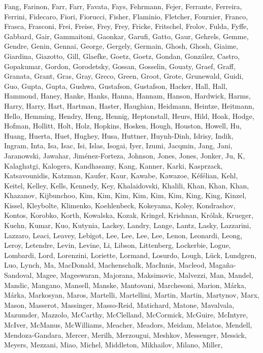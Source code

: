 \documentclass{aa}
\begin{document}
\begin{thebibliography}{242}
{  Fang, Farinon, Farr, Farr, Favata, Fays, Fehrmann, Fejer, Ferrante, Ferreira,
  Ferrini, Fidecaro, Fiori, Fiorucci, Fisher, Flaminio, Fletcher, Fournier,
  Franco, Frasca, Frasconi, Frei, Freise, Frey, Frey, Fricke, Fritschel,
  Frolov, Fulda, Fyffe, Gabbard, Gair, Gammaitoni, Gaonkar, Garufi, Gatto,
  Gaur, Gehrels, Gemme, Gendre, Genin, Gennai, George, Gergely, Germain, Ghosh,
  Ghosh, Giaime, Giardina, Giazotto, Gill, Glaefke, Goetz, Goetz, Gondan,
  González, Castro, Gopakumar, Gordon, Gorodetsky, Gossan, Gosselin, Gouaty,
  Graef, Graff, Granata, Grant, Gras, Gray, Greco, Green, Groot, Grote,
  Grunewald, Guidi, Guo, Gupta, Gupta, Gushwa, Gustafson, Gustafson, Hacker,
  Hall, Hall, Hammond, Haney, Hanke, Hanks, Hanna, Hannam, Hanson, Hardwick,
  Harms, Harry, Harry, Hart, Hartman, Haster, Haughian, Heidmann, Heintze,
  Heitmann, Hello, Hemming, Hendry, Heng, Hennig, Heptonstall, Heurs, Hild,
  Hoak, Hodge, Hofman, Hollitt, Holt, Holz, Hopkins, Hosken, Hough, Houston,
  Howell, Hu, Huang, Huerta, Huet, Hughey, Husa, Huttner, Huynh-Dinh, Idrisy,
  Indik, Ingram, Inta, Isa, Isac, Isi, Islas, Isogai, Iyer, Izumi, Jacqmin,
  Jang, Jani, Jaranowski, Jawahar, Jiménez-Forteza, Johnson, Jones, Jones,
  Jonker, Ju, K, Kalaghatgi, Kalogera, Kandhasamy, Kang, Kanner, Karki,
  Kasprzack, Katsavounidis, Katzman, Kaufer, Kaur, Kawabe, Kawazoe, Kéfélian,
  Kehl, Keitel, Kelley, Kells, Kennedy, Key, Khalaidovski, Khalili, Khan, Khan,
  Khan, Khazanov, Kijbunchoo, Kim, Kim, Kim, Kim, Kim, Kim, King, King, Kinzel,
  Kissel, Kleybolte, Klimenko, Koehlenbeck, Kokeyama, Koley, Kondrashov,
  Kontos, Korobko, Korth, Kowalska, Kozak, Kringel, Krishnan, Królak, Krueger,
  Kuehn, Kumar, Kuo, Kutynia, Lackey, Landry, Lange, Lantz, Lasky, Lazzarini,
  Lazzaro, Leaci, Leavey, Lebigot, Lee, Lee, Lee, Lee, Lenon, Leonardi, Leong,
  Leroy, Letendre, Levin, Levine, Li, Libson, Littenberg, Lockerbie, Logue,
  Lombardi, Lord, Lorenzini, Loriette, Lormand, Losurdo, Lough, Lück,
  Lundgren, Luo, Lynch, Ma, MacDonald, Machenschalk, MacInnis, Macleod,
  Magaña-Sandoval, Magee, Mageswaran, Majorana, Maksimovic, Malvezzi, Man,
  Mandel, Mandic, Mangano, Mansell, Manske, Mantovani, Marchesoni, Marion,
  Márka, Márka, Markosyan, Maros, Martelli, Martellini, Martin, Martin,
  Martynov, Marx, Mason, Masserot, Massinger, Masso-Reid, Matichard, Matone,
  Mavalvala, Mazumder, Mazzolo, McCarthy, McClelland, McCormick, McGuire,
  McIntyre, McIver, McManus, McWilliams, Meacher, Meadors, Meidam, Melatos,
  Mendell, Mendoza-Gandara, Mercer, Merilh, Merzougui, Meshkov, Messenger,
  Messick, Meyers, Mezzani, Miao, Michel, Middleton, Mikhailov, Milano, Miller,
}
\end{thebibliography}
\end{document}
